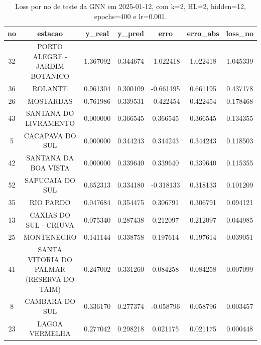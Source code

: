 \begin{table}[h]
\centering
\caption{Loss por no de teste da GNN em 2025-01-12, com k=2, HL=2, hidden=12, epochs=400 e lr=0.001.}
\label{tab:gnn_loss_k2_hl2_h12_e400_d20250112}
\begin{tabular}{ccccccc}
\toprule
no & estacao & y\_real & y\_pred & erro & erro\_abs & loss\_no \\
\midrule
32 & PORTO ALEGRE - JARDIM BOTANICO & 1.367092 & 0.344674 & -1.022418 & 1.022418 & 1.045339 \\
36 & ROLANTE & 0.961304 & 0.300109 & -0.661195 & 0.661195 & 0.437178 \\
26 & MOSTARDAS & 0.761986 & 0.339531 & -0.422454 & 0.422454 & 0.178468 \\
43 & SANTANA DO LIVRAMENTO & 0.000000 & 0.366545 & 0.366545 & 0.366545 & 0.134355 \\
5 & CACAPAVA DO SUL & 0.000000 & 0.344243 & 0.344243 & 0.344243 & 0.118503 \\
42 & SANTANA DA BOA VISTA & 0.000000 & 0.339640 & 0.339640 & 0.339640 & 0.115355 \\
52 & SAPUCAIA DO SUL & 0.652313 & 0.334180 & -0.318133 & 0.318133 & 0.101209 \\
35 & RIO PARDO & 0.047684 & 0.354475 & 0.306791 & 0.306791 & 0.094121 \\
13 & CAXIAS DO SUL - CRIUVA & 0.075340 & 0.287438 & 0.212097 & 0.212097 & 0.044985 \\
25 & MONTENEGRO & 0.141144 & 0.338758 & 0.197614 & 0.197614 & 0.039051 \\
41 & SANTA VITORIA DO PALMAR (RESERVA DO TAIM) & 0.247002 & 0.331260 & 0.084258 & 0.084258 & 0.007099 \\
8 & CAMBARA DO SUL & 0.336170 & 0.277374 & -0.058796 & 0.058796 & 0.003457 \\
23 & LAGOA VERMELHA & 0.277042 & 0.298218 & 0.021175 & 0.021175 & 0.000448 \\
\bottomrule
\end{tabular}
\end{table}
